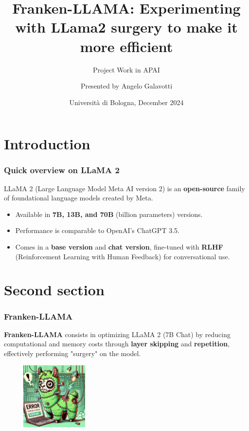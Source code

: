 \documentclass{beamer}
\title[] %
{Franken-LLAMA: Experimenting with LLama2 surgery to make it more efficient}
\subtitle{Project Work in APAI}
\author[Angelo Galavotti] %
{Presented by Angelo Galavotti}
\date[December 2024] %
{Università di Bologna, December 2024}
\begin{document}
\frame{\titlepage}




\section{Introduction}
\begin{frame}
  \frametitle{Quick overview on LLaMA 2}
  LLaMA 2 (Large Language Model Meta AI version 2) is an \textbf{open-source} family 
  of foundational language models created by Meta.
  \begin{itemize}
    \item Available in \textbf{7B, 13B, and 70B} (billion parameters) versions.
    \item Performance is comparable to OpenAI's ChatGPT 3.5.
    \item Comes in a \textbf{base version} and \textbf{chat version}, fine-tuned with
    \textbf{RLHF} (Reinforcement Learning with Human Feedback) for conversational use.
  \end{itemize}
  \end{frame}


\section{Second section}

\begin{frame}
\frametitle{Franken-LLAMA}
\textbf{Franken-LLAMA} consists in optimizing LLaMA 2 (7B Chat) by reducing 
computational and memory costs through \textbf{layer skipping} and \textbf{repetition}, effectively performing "surgery" on the model.
\begin{figure}[h] %
  \centering
  \includegraphics[width=0.3\textwidth]{images/image.png}
\end{figure}
\end{frame}
\end{document}
